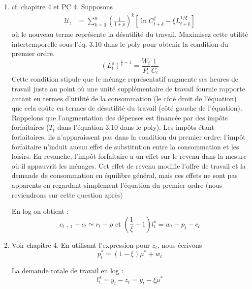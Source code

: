 \documentclass[a4paper,11pt]{article}
\begin{document}
\begin{enumerate}
\item cf. chapitre 4 et PC 4. Supposons \begin{align}
\mathcal{U}_{t}  &  =\sum_{k=0}^{n}\left(  \frac{1}{1+\rho}\right)  ^{k}  \left[\ln
C_{t+k}^{j}  -\xi L_{t+k}^{1/\xi} \right]\label{2 - utilite intertemporelle}
\end{align}
où le nouveau terme représente la désutilité du travail. Maximisez cette utilité intertemporelle sous  l'éq. 3.10 dans le poly pour obtenir la condition du premier ordre. 
\begin{equation*}
\left(L_{t}^{o}\right)^{\frac{1}{\xi }-1}=\frac{W_{t}}{P_{t}} \frac{1}{C_t}\end{equation*}
Cette condition stipule que le ménage représentatif augmente ses heures de travail juste au point où une unité supplémentaire de travail fournie rapporte autant en termes d'utilité de la consommation (le côté droit de l'équation) que cela coûte en termes de désutilité du travail (côté gauche de l'équation). Rappelons que l'augmentation des dépenses est financée par des impôts forfaitaires ($ T_t $ dans l'équation 3.10 dans le poly). Les impôts étant forfaitaires, ils n'apparaissent pas dans la condition du premier ordre: l'impôt forfaitaire n'induit aucun effet de substitution entre la consommation et les loisirs. En revanche, l'impôt forfaitaire a un effet sur le revenu dans la mesure où il appauvrit les ménages. Cet effet de revenu  modifie l'offre de travail et la demande de consommation en équilibre général, mais ces effets ne sont pas apparents en regardant simplement l'équation du premier ordre (nous reviendrons sur cette question après)


En log on obtient :%
\begin{equation*}
c_{t+1}-c_{t}\simeq r_{t}-\rho \text{ \ et \ }\left( \frac{1}{\xi }-1\right)
l_{t}^{o}=w_{t}-p_{t}-c_{t}
\end{equation*}


\item Voir chapitre 4. En utilisant l'expression pour $ z_t $, nous écrivons
\begin{equation*}
p_{t}^{\ast }=\left( 1-\xi \right) \mu ^{\ast }+w_{t}
\end{equation*}%

La demande totale de travail en log :%
\begin{equation*}
l_{t}^{d}=y_{t}-z_{t}=y_{t}-\xi \mu ^{\ast }
\end{equation*}


\end{enumerate}
\end{document}
